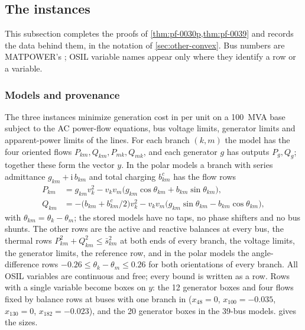 \subsection{The  instances}\label{app:powerflow}

This subsection completes the proofs of \cref{thm:pf-0030p,thm:pf-0039} and records the data behind them, in the notation of \cref{sec:other-convex}.
Bus numbers are MATPOWER's \citep{zimmerman2011-matpower-steady-state-operations-planning}; OSIL variable names appear only where they identify a row or a variable.

\subsubsection{Models and provenance}\label{app:powerflow-models}

The three instances minimize generation cost in per unit on a 100~MVA base subject to the AC power-flow equations, bus voltage limits, generator limits and apparent-power limits of the lines.
For each branch $(k,m)$ the model has the four oriented flows $P_{km},Q_{km},P_{mk},Q_{mk}$, and each generator $g$ has outputs $P_g,Q_g$; together these form the vector $y$.
In the polar models a branch with series admittance $g_{km}+\mathrm{i}\,b_{km}$ and total charging $b^c_{km}$ has the flow rows
\begin{align*}
P_{km}&=g_{km}v_k^2-v_kv_m\bigl(g_{km}\cos\theta_{km}+b_{km}\sin\theta_{km}\bigr),\\
Q_{km}&=-\bigl(b_{km}+b^c_{km}/2\bigr)v_k^2-v_kv_m\bigl(g_{km}\sin\theta_{km}-b_{km}\cos\theta_{km}\bigr),
\end{align*}
with $\theta_{km}=\theta_k-\theta_m$; the stored models have no taps, no phase shifters and no bus shunts.
The other rows are the active and reactive balances at every bus, the thermal rows $P_{km}^2+Q_{km}^2\le\bar s_{km}^2$ at both ends of every branch,
the voltage limits, the generator limits, the reference row, and in the polar models the angle-difference rows $-0.26\le\theta_k-\theta_m\le0.26$ for both orientations of every branch.
All OSIL variables are continuous and free; every bound is written as a row.
Rows with a single variable become boxes on $y$: the 12 generator boxes and four flows fixed by balance rows at buses with one branch in  ($x_{48}=0$, $x_{100}=-0.035$, $x_{130}=0$, $x_{182}=-0.023$), and the 20 generator boxes in the 39-bus models.
 gives the sizes.

